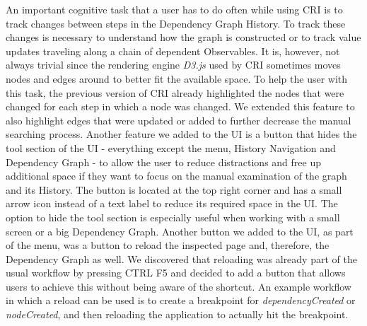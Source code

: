 An important cognitive task that a user has to do often while using CRI is to track changes between steps in the Dependency Graph History. To track these changes is necessary to understand how the graph is constructed or to track value updates traveling along a chain of dependent Observables. It is, however, not always trivial since the rendering engine \emph{D3.js} \cite{D3JS} used by CRI sometimes moves nodes and edges around to better fit the available space. To help the user with this task, the previous version of CRI already highlighted the nodes that were changed for each step in which a node was changed. We extended this feature to also highlight edges that were updated or added to further decrease the manual searching process. Another feature we added to the UI is a button that hides the tool section of the UI - everything except the menu, History Navigation and Dependency Graph - to allow the user to reduce distractions and free up additional space if they want to focus on the manual examination of the graph and its History. The button is located at the top right corner and has a small arrow icon instead of a text label to reduce its required space in the UI. The option to hide the tool section is especially useful when working with a small screen or a big Dependency Graph. Another button we added to the UI, as part of the menu, was a button to reload the inspected page and, therefore, the Dependency Graph as well. We discovered that reloading was already part of the usual workflow by pressing CTRL F5 and decided to add a button that allows users to achieve this without being aware of the shortcut. An example workflow in which a reload can be used is to create a breakpoint for \emph{dependencyCreated} or \emph{nodeCreated}, and then reloading the application to actually hit the breakpoint.
